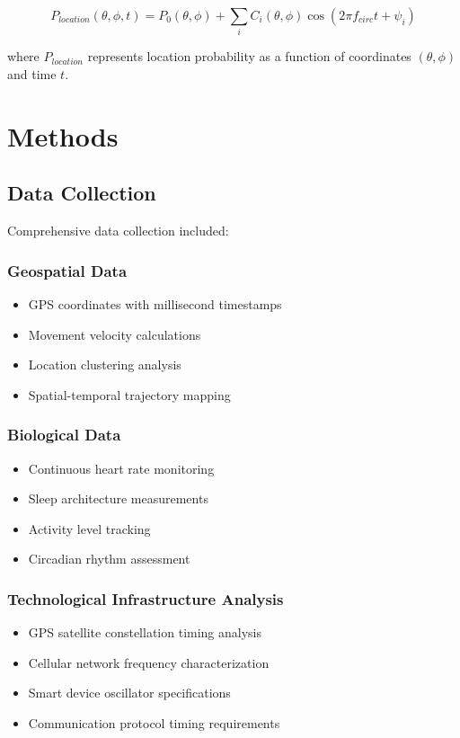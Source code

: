 \documentclass[12pt]{article}
\begin{document}
\begin{equation}
P_{location}(\theta, \phi, t) = P_0(\theta, \phi) + \sum_i C_i(\theta, \phi) \cos(2\pi f_{circ} t + \psi_i)
\end{equation}

where $P_{location}$ represents location probability as a function of coordinates $(\theta, \phi)$ and time $t$.

\section{Methods}

\subsection{Data Collection}

Comprehensive data collection included:

\subsubsection{Geospatial Data}
\begin{itemize}
\item GPS coordinates with millisecond timestamps
\item Movement velocity calculations
\item Location clustering analysis
\item Spatial-temporal trajectory mapping
\end{itemize}

\subsubsection{Biological Data}
\begin{itemize}
\item Continuous heart rate monitoring
\item Sleep architecture measurements
\item Activity level tracking
\item Circadian rhythm assessment
\end{itemize}

\subsubsection{Technological Infrastructure Analysis}
\begin{itemize}
\item GPS satellite constellation timing analysis
\item Cellular network frequency characterization
\item Smart device oscillator specifications
\item Communication protocol timing requirements
\end{itemize}
\end{document}
